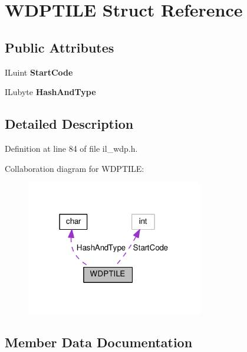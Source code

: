 \hypertarget{structWDPTILE}{}\section{W\+D\+P\+T\+I\+LE Struct Reference}
\label{structWDPTILE}
\subsection*{Public Attributes}
\begin{DoxyCompactItemize}
\item 
\mbox{\label{structWDPTILE_ab136327a83a62bf49a99f4a489d7becd}} 
I\+Luint {\bfseries Start\+Code}
\item 
\mbox{\label{structWDPTILE_a1e2c052b9c66a936c6fcdb1b20cddc45}} 
I\+Lubyte {\bfseries Hash\+And\+Type}
\end{DoxyCompactItemize}


\subsection{Detailed Description}


Definition at line 84 of file il\+\_\+wdp.\+h.



Collaboration diagram for W\+D\+P\+T\+I\+LE\+:
\nopagebreak
\begin{figure}[H]
\begin{center}
\leavevmode
\includegraphics[width=219pt]{df/d0b/structWDPTILE__coll__graph}
\end{center}
\end{figure}


\subsection{Member Data Documentation}
\mbox{\label{structWDPTILE_a1e2c052b9c66a936c6fcdb1b20cddc45}} 
